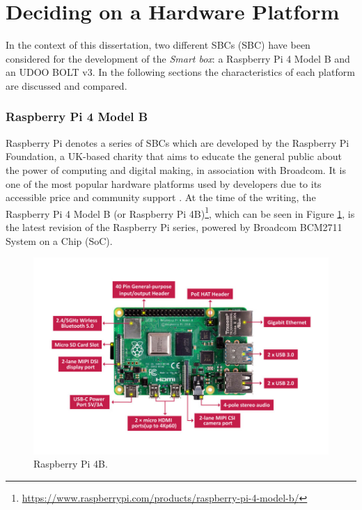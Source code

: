 \section{Deciding on a Hardware Platform}

In the context of this dissertation, two different \acl{SBC}s (\acs{SBC}) have been considered for the development of the \textit{Smart box}: a Raspberry Pi 4 Model B and an UDOO BOLT v3. In the following sections the characteristics of each platform are discussed and compared. 

\subsubsection{Raspberry Pi 4 Model B}

Raspberry Pi denotes a series of \acs{SBC}s which are developed by the Raspberry Pi Foundation, a UK-based charity that aims to educate the general public about the power of computing and digital making, in association with Broadcom. It is one of the most popular hardware platforms used by developers due to its accessible price and community support \cite{jain2021introduction}.
At the time of the writing, the Raspberry Pi 4 Model B (or Raspberry Pi 4B)\footnote{\url{https://www.raspberrypi.com/products/raspberry-pi-4-model-b/}}, which can be seen in Figure \ref{fig:raspberrypi-image}, is the latest revision of the Raspberry Pi series, powered by Broadcom BCM2711 System on a Chip (SoC).

\begin{figure}[H]
    \centering
    \includegraphics[width=\linewidth]{images/raspberry-4-modele-b-4go.jpg}
    \caption{Raspberry Pi 4B.}
    \label{fig:raspberrypi-image}
\end{figure}

